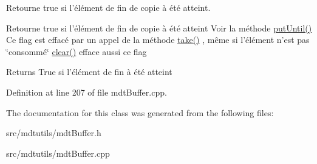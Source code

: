 Retourne true si l'élément de fin de copie à été atteint. 

Retourne true si l'élément de fin de copie à été atteint Voir la méthode \hyperlink{classmdt_buffer_a01d74092785c9442014ee34624ffa96f}{putUntil()} Ce flag est effacé par un appel de la méthode \hyperlink{classmdt_buffer_ad4756dea3500741363092d5a85ef858e}{take()} , même si l'élément n'est pas \char`\"{}consommé\char`\"{} \hyperlink{classmdt_buffer_a697920838a6c786209607c2b6ac0858a}{clear()} efface aussi ce flag

\begin{DoxyReturn}{Returns}
True si l'élément de fin à été atteint 
\end{DoxyReturn}


Definition at line 207 of file mdtBuffer.cpp.



The documentation for this class was generated from the following files:\begin{DoxyCompactItemize}
\item 
src/mdtutils/mdtBuffer.h\item 
src/mdtutils/mdtBuffer.cpp\end{DoxyCompactItemize}
